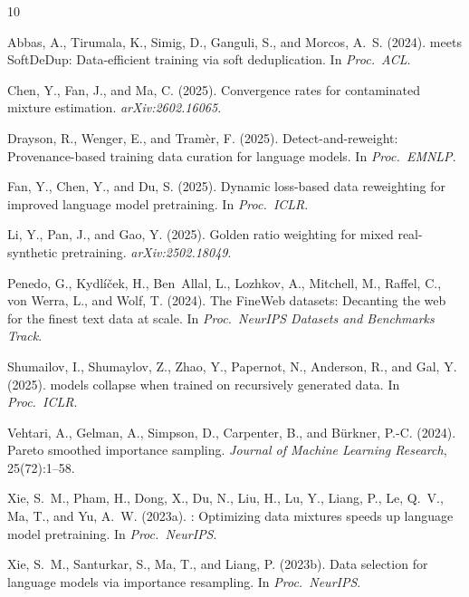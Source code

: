 \documentclass[11pt,a4paper]{article}
\begin{document}
\begin{thebibliography}{10}
\providecommand{\natexlab}[1]{#1}

Abbas, A., Tirumala, K., Simig, D., Ganguli, S., and Morcos, A.~S. (2024).
 meets {SoftDeDup}: Data-efficient training via soft deduplication.
\newblock In \emph{Proc.\ ACL}.

Chen, Y., Fan, J., and Ma, C. (2025).
\newblock Convergence rates for contaminated mixture estimation.
\newblock \emph{arXiv:2602.16065}.

Drayson, R., Wenger, E., and Tram\`{e}r, F. (2025).
\newblock Detect-and-reweight: Provenance-based training data curation for language models.
\newblock In \emph{Proc.\ EMNLP}.

Fan, Y., Chen, Y., and Du, S. (2025).
\newblock Dynamic loss-based data reweighting for improved language model pretraining.
\newblock In \emph{Proc.\ ICLR}.

Li, Y., Pan, J., and Gao, Y. (2025).
\newblock Golden ratio weighting for mixed real-synthetic pretraining.
\newblock \emph{arXiv:2502.18049}.

Penedo, G., Kydl\'{i}\v{c}ek, H., Ben~Allal, L., Lozhkov, A., Mitchell, M., Raffel, C., von Werra, L., and Wolf, T. (2024).
\newblock The {FineWeb} datasets: Decanting the web for the finest text data at scale.
\newblock In \emph{Proc.\ NeurIPS Datasets and Benchmarks Track}.

Shumailov, I., Shumaylov, Z., Zhao, Y., Papernot, N., Anderson, R., and Gal, Y. (2025).
 models collapse when trained on recursively generated data.
\newblock In \emph{Proc.\ ICLR}.

Vehtari, A., Gelman, A., Simpson, D., Carpenter, B., and B\"{u}rkner, P.-C. (2024).
\newblock Pareto smoothed importance sampling.
\newblock \emph{Journal of Machine Learning Research}, 25(72):1--58.

Xie, S.~M., Pham, H., Dong, X., Du, N., Liu, H., Lu, Y., Liang, P., Le, Q.~V., Ma, T., and Yu, A.~W. (2023a).
: Optimizing data mixtures speeds up language model pretraining.
\newblock In \emph{Proc.\ NeurIPS}.

Xie, S.~M., Santurkar, S., Ma, T., and Liang, P. (2023b).
\newblock Data selection for language models via importance resampling.
\newblock In \emph{Proc.\ NeurIPS}.

\end{thebibliography}
\end{document}
